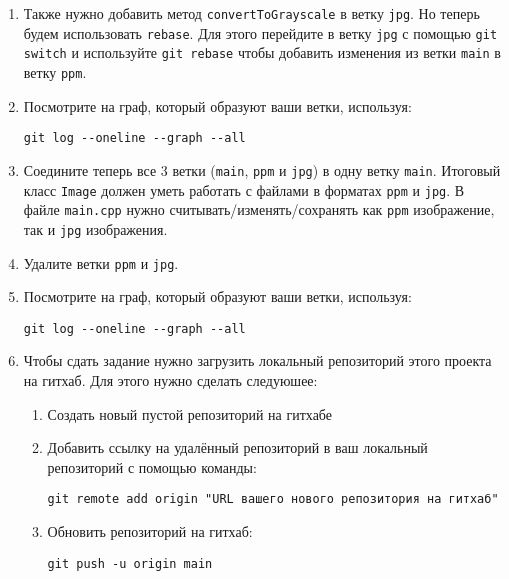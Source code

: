 \documentclass{article}
\begin{document}
\begin{enumerate}
\item Также нужно добавить метод \texttt{convertToGrayscale} в ветку \texttt{jpg}. Но теперь будем использовать \texttt{rebase}. Для этого перейдите в ветку \texttt{jpg} с помощью \texttt{git switch} и используйте \texttt{git rebase} чтобы добавить изменения из ветки \texttt{main} в ветку \texttt{ppm}.

\item Посмотрите на граф, который образуют ваши ветки, используя:
\begin{verbatim}
git log --oneline --graph --all
\end{verbatim}

\item Соедините теперь все 3 ветки (\texttt{main}, \texttt{ppm} и \texttt{jpg}) в одну ветку \texttt{main}.
Итоговый класс \texttt{Image} должен уметь работать с файлами в форматах \texttt{ppm} и \texttt{jpg}. В файле \texttt{main.cpp} нужно считывать/изменять/сохранять как \texttt{ppm} изображение, так и \texttt{jpg} изображения.

\item Удалите ветки \texttt{ppm} и \texttt{jpg}.

\item Посмотрите на граф, который образуют ваши ветки, используя:
\begin{verbatim}
git log --oneline --graph --all
\end{verbatim}

\item Чтобы сдать задание нужно загрузить локальный репозиторий этого проекта на гитхаб. Для этого нужно сделать следуюшее:

\begin{enumerate}
\item Создать новый пустой репозиторий на гитхабе
\item Добавить ссылку на удалённый репозиторий в ваш локальный репозиторий с помощью команды:
\begin{verbatim}
git remote add origin "URL вашего нового репозитория на гитхаб"
\end{verbatim}

\item Обновить репозиторий на гитхаб:
\begin{verbatim}
git push -u origin main
\end{verbatim}
\end{enumerate}

\end{enumerate}
\end{document}
